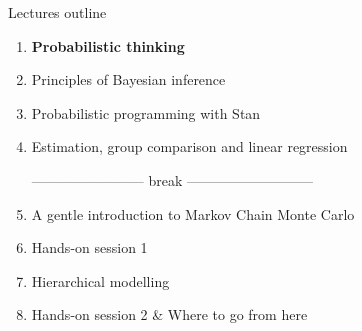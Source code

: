 \begin{frame}{Lectures outline}

\begin{enumerate}

\item \textbf{Probabilistic thinking}

\item Principles of Bayesian inference

\item Probabilistic programming with Stan

\item Estimation, group comparison and linear regression

\smallskip

------------------------ break ---------------------------

\item A gentle introduction to Markov Chain Monte Carlo

\item Hands-on session 1

\item Hierarchical modelling

\item Hands-on session 2 \& Where to go from here
\end{enumerate}
\end{frame}


